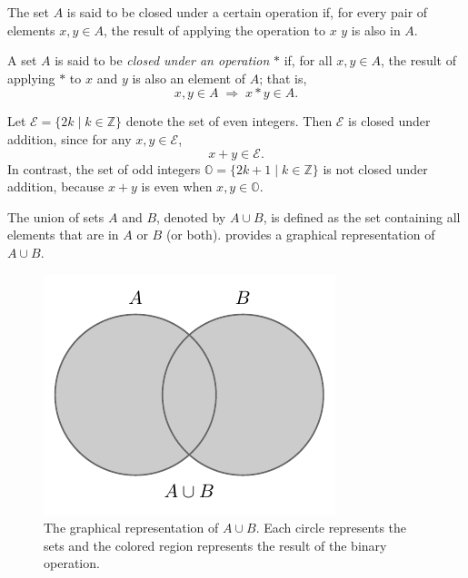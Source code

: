 \begin{definition}[Closure]
	\label{def:closure}
	The set $A$ is said to be closed under a certain operation if, for every pair of elements $x,y\in A$, the result of applying the operation to $x$ $y$ is also in $A$.
\end{definition}

\begin{definition}[Closure]
	A set $A$ is said to be \emph{closed under an operation} $\ast$ if, for all $x, y \in A$, the result of applying $\ast$ to $x$ and $y$ is also an element of $A$; that is,
	\begin{equation}
		x, y \in A \;\Rightarrow\; x \ast y \in A.
	\end{equation}
\end{definition}

\begin{example}
	Let $\mathcal{E} = \{ 2k \mid k \in \mathbb{Z} \}$ denote the set of even integers.
	Then $\mathcal{E}$ is closed under addition, since for any $x, y \in \mathcal{E}$,
	\begin{equation}
		x + y \in \mathcal{E}.
	\end{equation}
	In contrast, the set of odd integers $\mathbb{O} = \{ 2k + 1 \mid k \in \mathbb{Z} \}$ is not closed under addition, because $x + y$ is even when $x, y \in \mathbb{O}$.
\end{example}

\newpage
\begin{definition}[Union]
	The union of sets $A$ and $B$, denoted by $A \cup B$, is defined as the set containing all elements that are in $A$ or $B$ (or both).  provides a graphical representation of $A \cup B$.
	\begin{figure}[h]
		\centering
		\includegraphics[]{figures/set_union.pdf}
		\caption{The graphical representation of $A\cup B$. Each circle represents the sets and the colored region represents the result of the binary operation.}
		\label{fig:set_union}
	\end{figure}
\end{definition}

